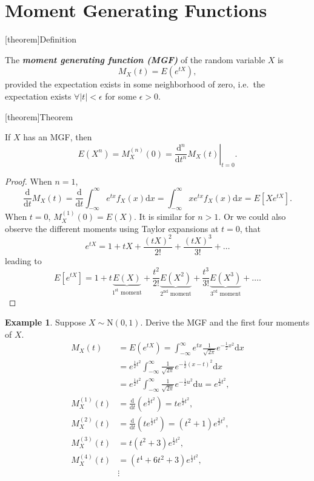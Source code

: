 \documentclass[12pt]{report}
\theoremstyle{definition}
\begin{document}
\section{Moment Generating Functions}

[theorem]{Definition}
\begin{mgf}
    The \textbf{\emph{moment generating function (MGF)}} of the random variable
    $X$ is
    \[
        M_X(t)=E\left(e^{tX}\right),
    \]
    provided the expectation exists in some neighborhood of zero, i.e.\ the
    expectation exists $\forall |t|<\epsilon$ for some $\epsilon>0$.
\end{mgf}

[theorem]{Theorem}
\begin{MGF regarding E(X)}
    If $X$ has an MGF, then
    \[
        E(X^{n})=M_X^{(n)}(0)=\left.\frac{\mathrm{d}^n}{\mathrm{d}t^n}M_X(t)\right|_{t=0}.
    \]
\end{MGF regarding E(X)}
\begin{proof}
    When $n=1$,
    \[
        \frac{\mathrm{d}}{\mathrm{d}t}M_X(t)=\frac{\mathrm{d}}{\mathrm{d}t}\int_{-\infty}^{\infty}
        e^{tx}f_X(x)\mathrm{d}x=\int_{-\infty}^{\infty}
        xe^{tx}f_X(x)\mathrm{d}x=E\left[Xe^{tX}\right].
    \]
    When $t=0$, $M_X^{(1)}(0)=E(X)$. It is similar for $n>1$.
    Or we could also observe the different moments using Taylor expansions at
    $t=0$, that
    \[
        e^{tX} =1+tX+\frac{{(tX)}^{2}}{2!}+\frac{{(tX)}^{3}}{3!}+\ldots
    \]
    leading to
    \[
        E\left[e^{tX}\right]=1+t \underbrace{E(X)}_{1^{\text{st}}\text{ moment}}
        +\frac{t^2}{2!}\underbrace{E(X^2)}_{2^{\text{nd}}\text{ moment}}
        +\frac{t^3}{3!}\underbrace{E(X^3)}_{3^{\text{rd}}\text{ moment}}+\ldots.
    \]
\end{proof} 

\newtheorem{MGF example}[theorem]{Example}
\begin{MGF example}
    Suppose $X\sim\text{N}(0,1)$. Derive the MGF and the first four moments of
    $X$.
    \begin{align*}
        M_X(t)
        & =E(e^{tX}) =\int_{-\infty}^{\infty}
        e^{tx}\frac{1}{\sqrt{2\pi}}e^{-\frac{1}{2}x^2}\mathrm{d}x\\
        & =e^{\frac{1}{2}t^2}\int_{-\infty}^{\infty}\frac{1}{\sqrt{2\pi}}
        e^{-\frac{1}{2}{(x-t)}^{2}}\mathrm{d}x \\
        & =e^{\frac{1}{2}t^2}\int_{-\infty}^{\infty} \frac{1}{\sqrt{2\pi}}
        e^{-\frac{1}{2}u^2}\mathrm{d}u =e^{\frac{1}{2}t^2},\\
        M_X^{(1)}(t)&=\frac{\mathrm{d}}{\mathrm{d}t}\left(e^{\frac{1}{2}t^2}\right)=te^{\frac{1}{2}t^2},\\
        M_X^{(2)}(t)&=\frac{\mathrm{d}}{\mathrm{d}t}\left(te^{\frac{1}{2}t^2}\right)=(t^2+1)e^{\frac{1}{2}t^2},\\
        M_X^{(3)}(t)&=t(t^2+3)e^{\frac{1}{2}t^2},\\
        M_X^{(4)}(t)&=(t^4+6t^2+3)e^{\frac{1}{2}t^2},\\
                    &\vdots
    \end{align*} 
\end{MGF example}
\end{document}
